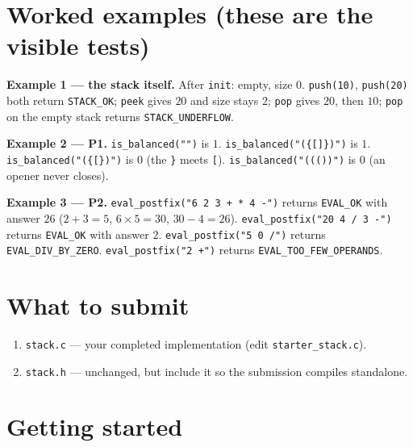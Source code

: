 \documentclass[11pt]{article}
\begin{document}
\section{Worked examples (these are the visible tests)}

\textbf{Example 1 --- the stack itself.} After \texttt{init}: empty, size $0$. \texttt{push(10)}, \texttt{push(20)} both return \texttt{STACK\_OK}; \texttt{peek} gives $20$ and size stays $2$; \texttt{pop} gives $20$, then $10$; \texttt{pop} on the empty stack returns \texttt{STACK\_UNDERFLOW}.

\textbf{Example 2 --- P1.} \texttt{is\_balanced("")} is $1$. \texttt{is\_balanced("(\{[]\})")} is $1$. \texttt{is\_balanced("(\{[\})")} is $0$ (the \texttt{\}} meets \texttt{[}). \texttt{is\_balanced("((())")} is $0$ (an opener never closes).

\textbf{Example 3 --- P2.} \texttt{eval\_postfix("6 2 3 + * 4 -")} returns \texttt{EVAL\_OK} with answer $26$ ($2+3=5$, $6\times5=30$, $30-4=26$). \texttt{eval\_postfix("20 4 / 3 -")} returns \texttt{EVAL\_OK} with answer $2$. \texttt{eval\_postfix("5 0 /")} returns \texttt{EVAL\_DIV\_BY\_ZERO}. \texttt{eval\_postfix("2 +")} returns \texttt{EVAL\_TOO\_FEW\_OPERANDS}.

\section{What to submit}

\begin{enumerate}
  \item \texttt{stack.c} --- your completed implementation (edit \texttt{starter\_stack.c}).
  \item \texttt{stack.h} --- unchanged, but include it so the submission compiles standalone.
\end{enumerate}

\section{Getting started}
\end{document}
